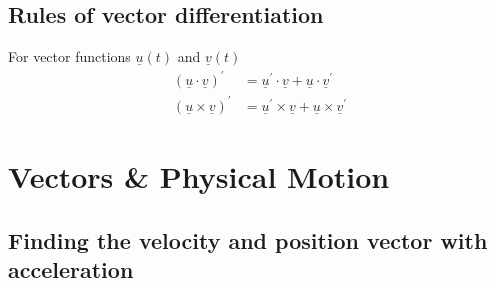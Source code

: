 \subsection{Rules of vector differentiation}
\begin{framed}
  For vector functions $ \underline{u}(t)$ and $ \underline{v}(t)$ 
  \begin{align*}
     \left( \underline{u} \cdot \underline{v} \right)^{\prime} 
     &= \underline{u}^{\prime} \cdot \underline{v} + \underline{u} \cdot \underline{v}^{\prime}\\
     \left( \underline{u} \times \underline{v} \right)^{\prime} 
     &= \underline{u}^{\prime} \times \underline{v} + \underline{u} \times \underline{v}^{\prime}
  \end{align*}
\end{framed}

\section{Vectors \& Physical Motion}

\subsection{Finding the velocity and position vector with acceleration}

